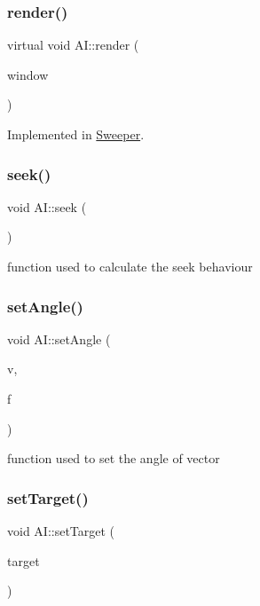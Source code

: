 \subsubsection{\texorpdfstring{render()}{render()}}
{\footnotesize\ttfamily virtual void A\+I\+::render (\begin{DoxyParamCaption}\item[{sf\+::\+Render\+Window \&}]{window }\end{DoxyParamCaption})\hspace{0.3cm}{\ttfamily [pure virtual]}}



Implemented in \mbox{\hyperlink{class_sweeper_a8308b5cec3c19e0292947081100d777b}{Sweeper}}.

\mbox{\label{class_a_i_a52f464d4a5079e2e3a11aeb4f18c4fc3}} 
\subsubsection{\texorpdfstring{seek()}{seek()}}
{\footnotesize\ttfamily void A\+I\+::seek (\begin{DoxyParamCaption}{ }\end{DoxyParamCaption})}

function used to calculate the seek behaviour \mbox{\label{class_a_i_a79d3e48945e34807fd2e340032cda22d}} 
\subsubsection{\texorpdfstring{setAngle()}{setAngle()}}
{\footnotesize\ttfamily void A\+I\+::set\+Angle (\begin{DoxyParamCaption}\item[{\mbox{\hyperlink{class_vector2f}{Vector2f}} \&}]{v,  }\item[{float}]{f }\end{DoxyParamCaption})}

function used to set the angle of vector \mbox{\label{class_a_i_af39a721d8336a0c5e03aedbd6c35dc59}} 
\subsubsection{\texorpdfstring{setTarget()}{setTarget()}}
{\footnotesize\ttfamily void A\+I\+::set\+Target (\begin{DoxyParamCaption}\item[{\mbox{\hyperlink{class_vector2f}{Vector2f}}}]{target }\end{DoxyParamCaption})}


